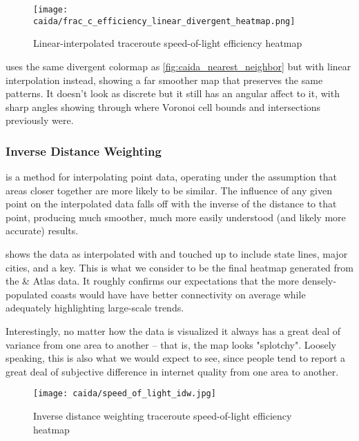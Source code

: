\begin{figure}[h]
    \centering
    \texttt{[image: caida/frac\_c\_efficiency\_linear\_divergent\_heatmap.png]}
    \caption{Linear-interpolated traceroute speed-of-light efficiency heatmap}
    \label{fig:caida_linear_interpolation}
\end{figure}

 uses the same divergent colormap as \cref{fig:caida_nearest_neighbor} but with linear interpolation instead, showing a far smoother map that preserves the same patterns. It doesn't look as discrete but it still has an angular affect to it, with sharp angles showing through where Voronoi cell bounds and intersections previously were.

\subsubsection{Inverse Distance Weighting}

\IDW is a method for interpolating point data, operating under the assumption that areas closer together are more likely to be similar. The influence of any given point on the interpolated data falls off with the inverse of the distance to that point, producing much smoother, much more easily understood (and likely more accurate) results.

 shows the data as interpolated with \idw and touched up to include state lines, major cities, and a key. This is what we consider to be the final heatmap generated from the \caida \& \ripe Atlas data. It roughly confirms our expectations that the more densely-populated coasts would have have better connectivity on average while adequately highlighting large-scale trends.

Interestingly, no matter how the data is visualized it always has a great deal of variance from one area to another -- that is, the map looks "splotchy". Loosely speaking, this is also what we would expect to see, since people tend to report a great deal of subjective difference in internet quality from one area to another.

\begin{figure}[h]
    \centering
    \texttt{[image: caida/speed\_of\_light\_idw.jpg]}
    \caption{Inverse distance weighting traceroute speed-of-light efficiency heatmap}
    \label{fig:caida_idw_heatmap}
\end{figure}
